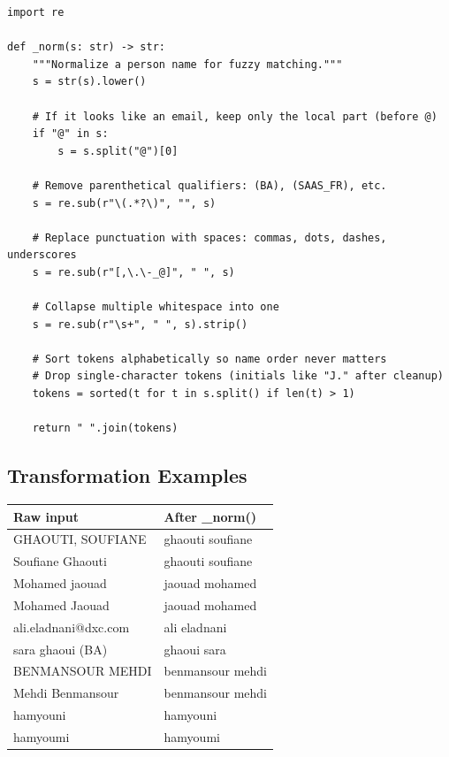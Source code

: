 \documentclass[12pt, a4paper]{article}
\begin{document}
\begin{lstlisting}[style=python, caption={\_norm: canonical token set}]
import re

def _norm(s: str) -> str:
    """Normalize a person name for fuzzy matching."""
    s = str(s).lower()

    # If it looks like an email, keep only the local part (before @)
    if "@" in s:
        s = s.split("@")[0]

    # Remove parenthetical qualifiers: (BA), (SAAS_FR), etc.
    s = re.sub(r"\(.*?\)", "", s)

    # Replace punctuation with spaces: commas, dots, dashes, underscores
    s = re.sub(r"[,\.\-_@]", " ", s)

    # Collapse multiple whitespace into one
    s = re.sub(r"\s+", " ", s).strip()

    # Sort tokens alphabetically so name order never matters
    # Drop single-character tokens (initials like "J." after cleanup)
    tokens = sorted(t for t in s.split() if len(t) > 1)

    return " ".join(tokens)
\end{lstlisting}

\subsection{Transformation Examples}

\begin{center}
\begin{tabular}{>{\ttfamily}l >{\ttfamily}l}
    \toprule
    \normalfont\textbf{Raw input} & \normalfont\textbf{After \_norm()} \\
    \midrule
    GHAOUTI, SOUFIANE            & ghaouti soufiane \\
    Soufiane Ghaouti             & ghaouti soufiane \\
    Mohamed jaouad               & jaouad mohamed \\
    Mohamed Jaouad               & jaouad mohamed \\
    ali.eladnani@dxc.com         & ali eladnani \\
    sara ghaoui (BA)             & ghaoui sara \\
    BENMANSOUR MEHDI             & benmansour mehdi \\
    Mehdi Benmansour             & benmansour mehdi \\
    hamyouni                     & hamyouni \\
    hamyoumi                     & hamyoumi \\
    \bottomrule
\end{tabular}
\end{center}
\end{document}

